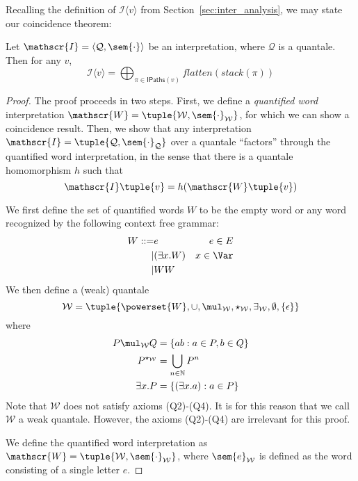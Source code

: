    Recalling the definition of $\mathscr{I}\langle v \rangle$ from
   Section~\ref{sec:inter_analysis}, we may state our coincidence theorem:
   \begin{theorem}[Coincidence] \label{thm:coincidence}
     Let $\mathscr{I} = \langle \mathcal{Q}, \sem{\cdot} \rangle$ be an
     interpretation, where $\mathcal{Q}$ is a quantale.  Then for any $v$,
     \begin{equation*}
       \mathscr{I}\langle v \rangle = \bigoplus_{\pi \in \mathsf{IPaths}(v)} \textit{flatten}(\textit{stack}(\pi))
     \end{equation*}
   \end{theorem}
   \begin{proof}
     The proof proceeds in two steps.  First, we define a \emph{quantified
       word} interpretation $\mathscr{W} = \tuple{\mathcal{W},
       \sem{\cdot}_{\mathcal{W}}}$, for which we can show a coincidence
     result.  Then, we show that any interpretation $\mathscr{I} =
     \tuple{\mathcal{Q}, \sem{\cdot}_{\mathcal{Q}}}$ over a quantale
     ``factors'' through the quantified word interpretation, in the sense that
     there is a quantale homomorphism $h$ such that
     \[\mathscr{I}\tuple{v} =
     h(\mathscr{W}\tuple{v})\]

     We first define the set of quantified words $W$ to be the empty word or
     any word recognized by the following context free grammar:
     \begin{align*}
       W ::= & e & e \in E\\
       | & (\exists x. W) & x \in \Var\\
       | & W W
     \end{align*}
     We then define a (weak) quantale
     \[ \mathcal{W} = \tuple{\powerset{W}, \cup, \mul_{\mathcal{W}}, \star_{\mathcal{W}}, \exists_{\mathcal{W}}, \emptyset, \{\epsilon\}} \]
     where
     \begin{align*}
       P\mul_{\mathcal{W}} Q &= \{ ab : a \in P, b \in Q \}\\
       P^{\star_{\mathcal{W}}} &= \bigcup_{n \in \mathbb{N}} P^n\\
         \exists x. P &= \{ (\exists x. a) : a \in P \}
     \end{align*}
     Note that $\mathcal{W}$ does not satisfy axioms (Q2)-(Q4).  It is for
     this reason that we call $\mathcal{W}$ a weak quantale.  However, the
     axioms (Q2)-(Q4) are irrelevant for this proof.

     We define the quantified word interpretation as $\mathscr{W} =
     \tuple{\mathcal{W}, \sem{\cdot}_{\mathcal{W}}}$, where
     $\sem{e}_{\mathcal{W}}$ is defined as the word consisting of a single
     letter $e$.


\end{proof}
